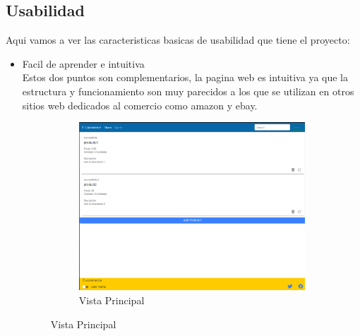 \documentclass{article}
\begin{document}
\subsection{Usabilidad}
\quad Aqui vamos a ver las caracteristicas basicas de usabilidad que tiene el proyecto:
\begin{itemize}
    \item Facil de aprender e intuitiva \\
   \phantom{ab}Estos dos puntos son complementarios, la pagina web es intuitiva ya que la estructura y funcionamiento son muy parecidos a los que se utilizan en otros sitios web dedicados al comercio como amazon y ebay.
   \begin{figure}[h]
    \ContinuedFloat*
    \centering
    \begin{subfigure}[h]{0.45\textwidth}
    \includegraphics[scale=0.25]{usability/home.png}
    \caption{Vista Principal}
    \label{Fig:Home}
    \end{subfigure}
    
\end{figure} 
   

\end{itemize}
\end{document}
